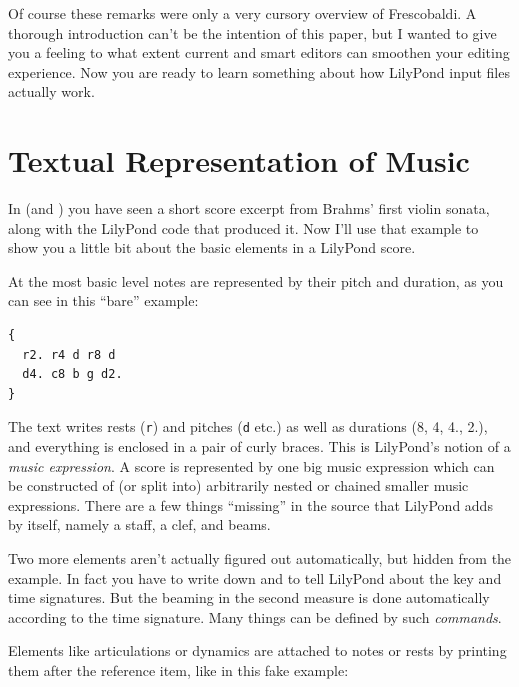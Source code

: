 \documentclass[DIV=12]{scrreprt}
\begin{document}
Of course these remarks were only a very cursory overview of Frescobaldi.
A thorough introduction can't be the intention of this paper, but I wanted to give you a feeling to what extent current and smart editors can smoothen your editing experience.
Now you are ready to learn something about how LilyPond input files actually work.

\section{Textual Representation of Music}
\label{sec:pt_textual-representation}
In  (and ) you have seen a short score excerpt from Brahms' first violin sonata, along with the LilyPond code that produced it.
Now I'll use that example to show you a little bit about the basic elements in a LilyPond score.

At the most basic level notes are represented by their pitch and duration, as you can see in this “bare” example:

\begin{multicols}{2}
\begin{Verbatim}[samepage=true,
				   commandchars=|„“]
{
  r2. r4 d r8 d
  d4. c8 b g d2.
}
\end{Verbatim}
\columnbreak
{}
\end{multicols}

The text writes rests (\texttt{r}) and pitches (\texttt{d} etc.) as well as durations (8, 4, 4., 2.), and everything is enclosed in a pair of curly braces.
This is LilyPond's notion of a \emph{music expression}.
A score is represented by one big music expression which can be constructed of (or split into) arbitrarily nested or chained smaller music expressions.
There are a few things “missing” in the source that LilyPond adds by itself, namely a staff, a clef, and beams.

Two more elements aren't actually figured out automatically, but hidden from the example.
In fact you have to write down   and to tell LilyPond about the key and time signatures.
But the beaming in the second measure is done automatically according to the time signature.
Many things can be defined by such \emph{commands}.

Elements like articulations or dynamics are attached to notes or rests by printing them after the reference item, like in this fake example:

\newcommand{\hilite}[1]{\textcolor{red}{\textbf{#1}}}
\end{document}
